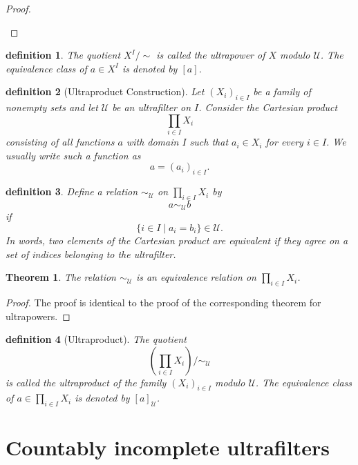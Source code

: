 \documentclass[10pt,a4paper]{book}
\newtheorem{definition}{definition}[section]
\newtheorem{theorem}{Theorem}[section]
\begin{document}
\begin{proof}
\begin{fitchproof}[arrayenv=tabular]
    \end{fitchproof}

\end{proof}




\begin{definition}
    The quotient
    $
        X^I /\sim
    $
    is called the \emph{ultrapower} of $X$ modulo $\mathcal{U}$. The equivalence
    class of $a\in X^I $ is denoted by $[a]$.
\end{definition}


\begin{definition}[Ultraproduct Construction]
    Let $(X_i)_{i\in I}$ be a family of nonempty sets and let $\mathcal{U}$ be an ultrafilter on $I$. Consider the Cartesian product
    \[
        \prod_{i\in I}X_i
    \]
    consisting of all functions $a$ with domain $I$ such that $a_i\in X_i$ for every $i\in I$. We usually write such a function as
    \[
        a=(a_i)_{i\in I}.
    \]
\end{definition}

\begin{definition}
    Define a relation $\sim_{\mathcal U}$ on $\prod_{i\in I}X_i$ by
    \[
        a\sim_{\mathcal U} b
    \]
    if
    \[
        \{i\in I\mid a_i=b_i\}\in\mathcal U.
    \]
    In words, two elements of the Cartesian product are equivalent if they agree on a set of indices belonging to the ultrafilter.
\end{definition}

\begin{theorem}
    The relation $\sim_{\mathcal U}$ is an equivalence relation on $\prod_{i\in I}X_i$.
\end{theorem}

\begin{proof}
    The proof is identical to the proof of the corresponding theorem for ultrapowers.
\end{proof}

\begin{definition}[Ultraproduct]
    The quotient
    \[
        \left(\prod_{i\in I}X_i\right)\big/\sim_{\mathcal U}
    \]
    is called the \emph{ultraproduct} of the family $(X_i)_{i\in I}$ modulo $\mathcal U$. The equivalence class of $a\in\prod_{i\in I}X_i$ is denoted by $[a]_{\mathcal U}$.
\end{definition}

\section{Countably incomplete ultrafilters}
\end{document}
